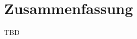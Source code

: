 \documentclass[a4paper,bibtotoc,oneside]{scrbook}
\begin{document}
\chapter{Zusammenfassung}
TBD






\end{document}
